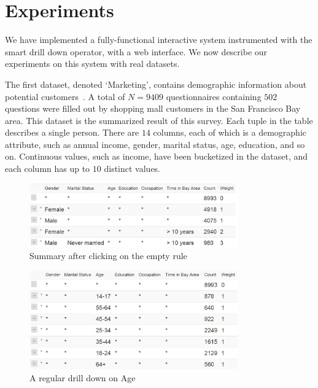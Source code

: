
\section{Experiments}\label{sec:experiments}
We have implemented a fully-functional interactive system instrumented with the smart drill down operator, with a web interface.
We now describe our experiments on this system with real datasets.

 The first dataset, denoted `Marketing', contains demographic information about potential customers~\cite{dataset1}. A total of $N=9409$ questionnaires containing $502$ questions were filled out by shopping mall customers in the San Francisco Bay area. This dataset is the summarized result of this survey. Each tuple in the table describes a single person. There are $14$ columns, each of which is a demographic attribute, such as annual income, gender, marital status, age, education, and so on. Continuous values, such as income, have been bucketized in the dataset, and each column has up to $10$ distinct values.

\begin{figure}
\vspace{-5pt}
\centering
\includegraphics[width=90mm]{graphs/screenshots6col/empty_expansion.jpg}
\caption{Summary after clicking on the empty rule \label{fig:uiexample1}}
\vspace{-15pt}
\end{figure}

\begin{figure}
\vspace{-5pt}
\centering
\includegraphics[width=90mm]{graphs/screenshots6col/age_drilldown.jpg}
\caption{A regular drill down on Age\label{fig:drilldownexample}}
\end{figure}

